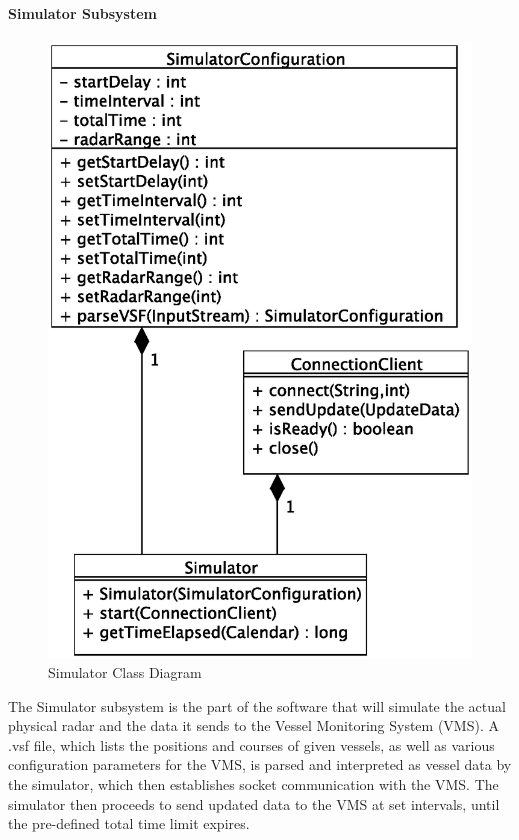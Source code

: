 \documentclass{article}
\begin{document}
\paragraph{Simulator Subsystem}

\begin{figure}[h]
\caption{Simulator Class Diagram}
\includegraphics[width=\linewidth]{diagrams/simulator-class-diagram.eps}
\end{figure}

The Simulator subsystem is the part of the software that will simulate the actual physical radar and the data it sends to the Vessel Monitoring System (VMS). A .vsf file, which lists the positions and courses of given vessels, as well as various configuration parameters for the VMS, is parsed and interpreted as vessel data by the simulator, which then establishes socket communication with the VMS. The simulator then proceeds to send updated data to the VMS at set intervals, until the pre-defined total time limit expires.
\end{document}
